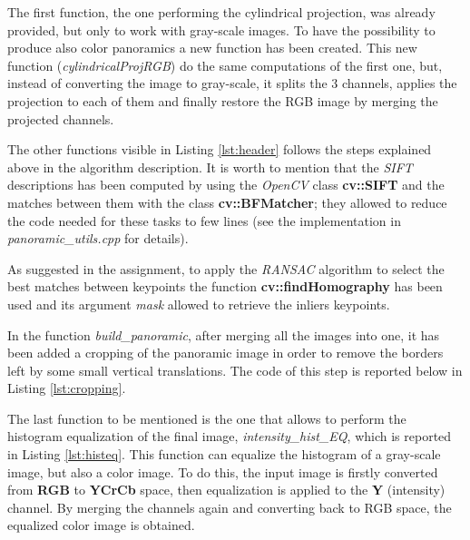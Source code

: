 \documentclass[11pt,a4paper]{article}
\begin{document}


The first function, the one performing the cylindrical projection, was already provided, but only to work with gray-scale images. To have the possibility to produce also color panoramics a new function has been created. This new function (\textit{cylindricalProjRGB}) do the same computations of the first one, but, instead of converting the image to gray-scale, it splits the 3 channels, applies the projection to each of them and finally restore the RGB image by merging the projected channels.

The other functions visible in Listing \ref{lst:header} follows the steps explained above in the algorithm description. It is worth to mention that the \textit{SIFT} descriptions has been computed by using the \textit{OpenCV} class \textbf{cv::SIFT} and the matches between them with the class \textbf{cv::BFMatcher}; they allowed to reduce the code needed for these tasks to few lines (see the implementation in \textit{panoramic\_utils.cpp} for details).

As suggested in the assignment, to apply the \textit{RANSAC} algorithm to select the best matches between keypoints the function \textbf{cv::findHomography} has been used and its argument \textit{mask} allowed to retrieve the inliers keypoints.

In the function \textit{build\_panoramic}, after merging all the images into one, it has been added a cropping of the panoramic image in order to remove the borders left by some small vertical translations. The code of this step is reported below in Listing \ref{lst:cropping}.



The last function to be mentioned is the one that allows to perform the histogram equalization of the final image, \textit{intensity\_hist\_EQ}, which is reported in Listing \ref{lst:histeq}.
This function can equalize the histogram of a gray-scale image, but also a color image. To do this, the input image is firstly converted from \textbf{RGB} to \textbf{YCrCb} space, then equalization is applied to the \textbf{Y} (intensity) channel. By merging the channels again and converting back to RGB space, the equalized color image is obtained.
\end{document}
